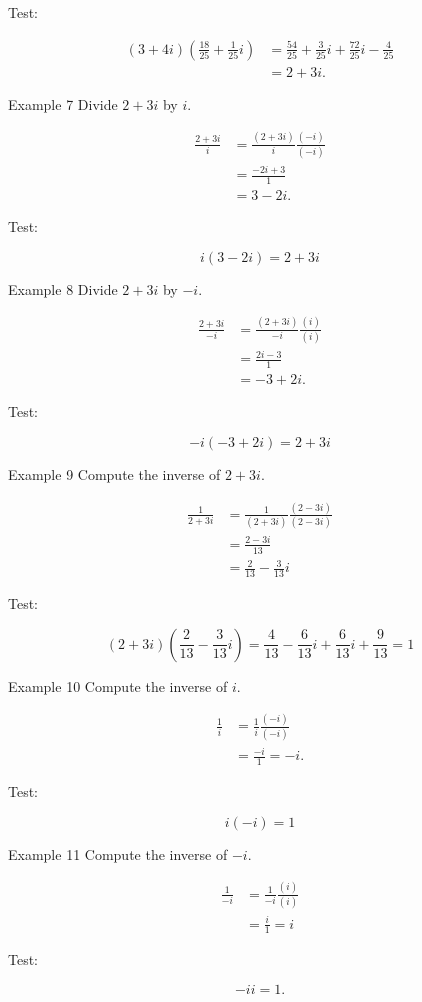 Test:

$$
\begin{aligned}
(3+4 i)\left(\frac{18}{25}+\frac{1}{25} i\right) & =\frac{54}{25}+\frac{3}{25} i+\frac{72}{25} i-\frac{4}{25} \\
& =2+3 i .
\end{aligned}
$$

Example 7 Divide $2+3 i$ by $i$.

$$
\begin{aligned}
\frac{2+3 i}{i} & =\frac{(2+3 i)}{i} \frac{(-i)}{(-i)} \\
& =\frac{-2 i+3}{1} \\
& =3-2 i .
\end{aligned}
$$

Test:

$$
i(3-2 i)=2+3 i
$$

Example 8 Divide $2+3 i$ by $-i$.

$$
\begin{aligned}
\frac{2+3 i}{-i} & =\frac{(2+3 i)}{-i} \frac{(i)}{(i)} \\
& =\frac{2 i-3}{1} \\
& =-3+2 i .
\end{aligned}
$$

Test:

$$
-i(-3+2 i)=2+3 i
$$

Example 9 Compute the inverse of $2+3 i$.

$$
\begin{aligned}
\frac{1}{2+3 i} & =\frac{1}{(2+3 i)} \frac{(2-3 i)}{(2-3 i)} \\
& =\frac{2-3 i}{13} \\
& =\frac{2}{13}-\frac{3}{13} i
\end{aligned}
$$

Test:

$$
(2+3 i)\left(\frac{2}{13}-\frac{3}{13} i\right)=\frac{4}{13}-\frac{6}{13} i+\frac{6}{13} i+\frac{9}{13}=1
$$

Example 10 Compute the inverse of $i$.

$$
\begin{aligned}
\frac{1}{i} & =\frac{1}{i} \frac{(-i)}{(-i)} \\
& =\frac{-i}{1}=-i .
\end{aligned}
$$

Test:

$$
i(-i)=1
$$

Example 11 Compute the inverse of $-i$.

$$
\begin{aligned}
\frac{1}{-i} & =\frac{1}{-i} \frac{(i)}{(i)} \\
& =\frac{i}{1}=i
\end{aligned}
$$

Test:

$$
-i i=1 .
$$
